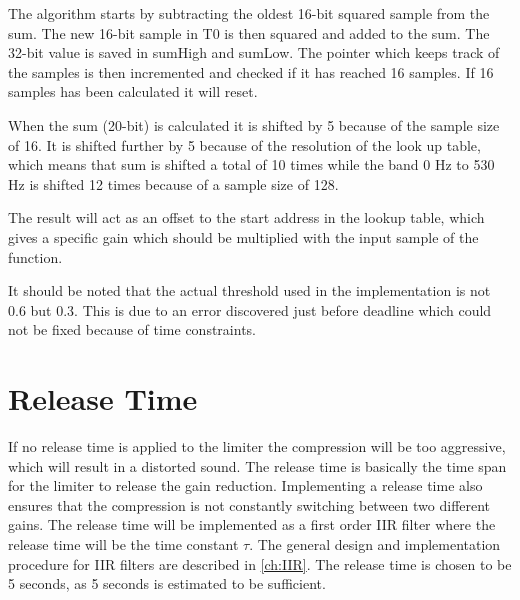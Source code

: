The algorithm starts by subtracting the oldest 16-bit squared sample from the sum. The new 16-bit sample in T0 is then squared and added to the sum. The 32-bit value is saved in sumHigh and sumLow. The pointer which keeps track of the samples is then incremented and checked if it has reached 16 samples. If 16 samples has been calculated it will reset.

When the sum (20-bit) is calculated it is shifted by 5 because of the sample size of 16. It is shifted further by 5 because of the resolution of the look up table, which means that sum is shifted a total of 10 times while the band 0 Hz to 530 Hz is shifted 12 times because of a sample size of 128. 

The result will act as an offset to the start address in the lookup table, which gives a specific gain which should be multiplied with the input sample of the function.

It should be noted that the actual threshold used in the implementation is not 0.6 but 0.3. This is due to an error discovered just before deadline which could not be fixed because of time constraints.



\section{Release Time}

If no release time is applied to the limiter the compression will be too aggressive, which will result in a distorted sound. The release time is basically the time span for the limiter to release the gain reduction. Implementing a release time also ensures that the compression is not constantly switching between two different gains. The release time will be implemented as a first order IIR filter where the release time will be the time constant $\tau$. The general design and implementation procedure for IIR filters are described in \autoref{ch:IIR}. The release time is chosen to be 5 seconds, as 5 seconds is estimated to be sufficient.

